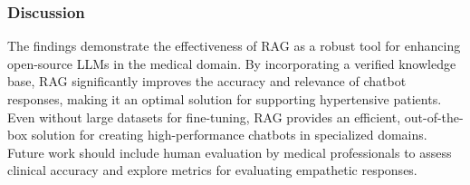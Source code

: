 \subsubsection{Discussion}
The findings demonstrate the effectiveness of \gls{RAG} as a robust tool for enhancing open-source \glspl{LLM} in the medical domain.
%
By incorporating a verified knowledge base, \gls{RAG} significantly improves the accuracy and relevance of chatbot responses, making it an optimal solution for supporting hypertensive patients.
%
Even without large datasets for fine-tuning, \gls{RAG} provides an efficient, out-of-the-box solution for creating high-performance chatbots in specialized domains.
%
Future work should include human evaluation by medical professionals to assess clinical accuracy and explore metrics for evaluating empathetic responses.